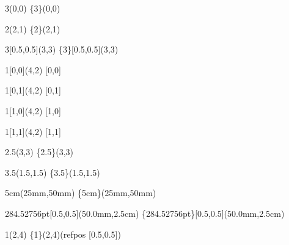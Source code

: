 \documentclass{article}
\begin{document}

\begin{textblock}{3}(0,0)
\{3\}(0,0)
\end{textblock}

\begin{textblock}{2}(2,1)
\{2\}(2,1)
\end{textblock}

\begin{textblock}{3}[0.5,0.5](3,3)
\{3\}[0.5,0.5](3,3)
\end{textblock}

\begin{textblock}{1}[0,0](4,2)
[0,0]
\end{textblock}
\begin{textblock}{1}[0,1](4,2)
[0,1]
\end{textblock}
\begin{textblock}{1}[1,0](4,2)
[1,0]
\end{textblock}
\begin{textblock}{1}[1,1](4,2)
\hfill [1,1]  %
\end{textblock}

\begin{textblock}{2.5}(3,3)
\{2.5\}(3,3)
\end{textblock}

\begin{textblock}{3.5}(1.5,1.5)
\{3.5\}(1.5,1.5)
\end{textblock}

\begin{textblock*}{5cm}(25mm,50mm)
\{5cm\}(25mm,50mm)
\end{textblock*}

\begin{textblock*}{284.52756pt}[0.5,0.5](50.0mm,2.5cm)
\{284.52756pt\}[0.5,0.5](50.0mm,2.5cm)
\end{textblock*}

\begin{textblock}{1}(2,4)
\{1\}(2,4)\hfil\break (refpos [0.5,0.5])
\end{textblock}

\end{document}

